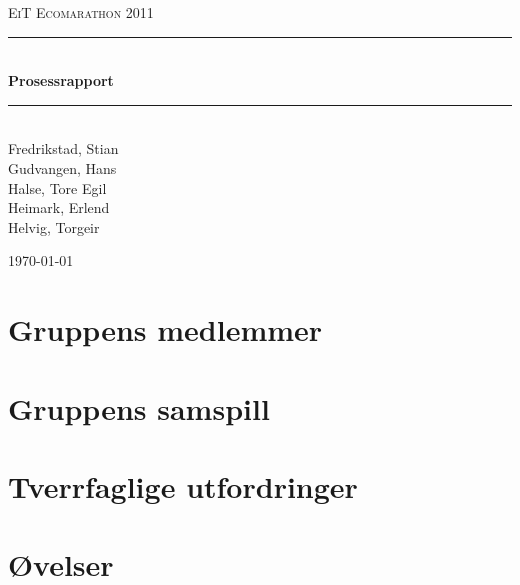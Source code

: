 \documentclass[a4paper,11pt]{report}
\newcommand{\HRule}{\rule{\linewidth}{0.5mm}}
\begin{document}
\begin{titlepage}

\begin{center}
\textsc{\LARGE EiT Ecomarathon 2011}\\[1.5cm]

\HRule \\[0.4cm]
{ \huge \bfseries Prosessrapport}\\[0.4cm]
\HRule \\[1.5cm] 

Fredrikstad, Stian\\
Gudvangen, Hans\\
Halse, Tore Egil\\
Heimark, Erlend\\
Helvig, Torgeir\\

\vfill
 
{\large \today}

\end{center}
\end{titlepage}
\cleardoublepage
{}
\tableofcontents
\listoffigures
\listoftables
\clearpage
\chapter{Gruppens medlemmer}





\chapter{Gruppens samspill}



\chapter{Tverrfaglige utfordringer}

\chapter{Øvelser}


\clearpage 
\cite{dummy} %
 
 
\end{document}
